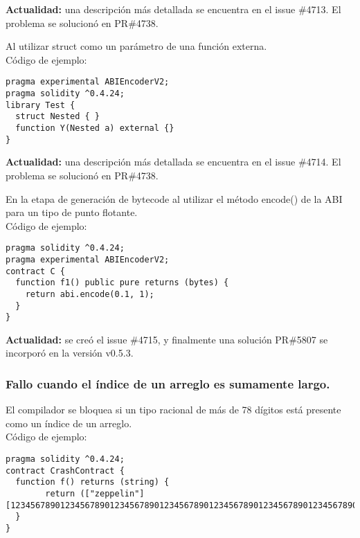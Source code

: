 \textbf{Actualidad:} una descripción más detallada se encuentra en el issue \#4713. El problema se solucionó en PR\#4738.

Al utilizar struct como un parámetro de una función externa.\\
Código de ejemplo:
\begin{lstlisting}[language=Solidity]
pragma experimental ABIEncoderV2;                                                                                                              
pragma solidity ^0.4.24;                                                                        
library Test {                                                                                                                                 
  struct Nested { }                                                                                                                          
  function Y(Nested a) external {}                                                                                                           
}
\end{lstlisting}

\textbf{Actualidad:} una descripción más detallada se encuentra en el issue \#4714. El problema se solucionó en PR\#4738.

En la etapa de generación de bytecode al utilizar el método encode() de la ABI para un tipo de punto flotante.\\

Código de ejemplo:
\begin{lstlisting}[language=Solidity]
pragma solidity ^0.4.24;
pragma experimental ABIEncoderV2;
contract C {
  function f1() public pure returns (bytes) {
    return abi.encode(0.1, 1);
  }
}
\end{lstlisting}

\textbf{Actualidad:} se creó el issue \#4715, y finalmente una solución PR\#5807 se incorporó en la versión v0.5.3.

\subsubsection{Fallo cuando el índice de un arreglo es sumamente largo.}

El compilador se bloquea si un tipo racional de más de 78 dígitos está presente como un índice de un arreglo.\\

Código de ejemplo:
\begin{lstlisting}[language=Solidity]
pragma solidity ^0.4.24;
contract CrashContract {
  function f() returns (string) {
        return (["zeppelin"][123456789012345678901234567890123456789012345678901234567890123456789012345678]);
  }
}
\end{lstlisting}

